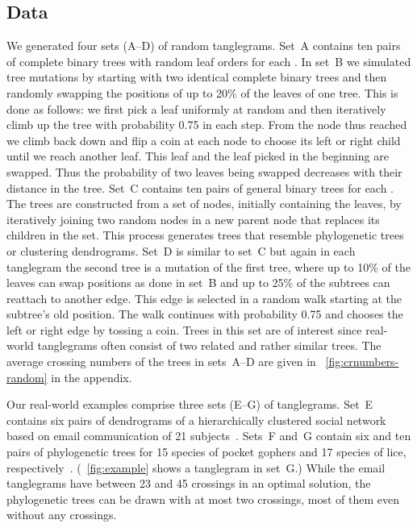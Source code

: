 \documentclass[runningheads,a4paper]{llncs}
\begin{document}
\subsection{Data}

We generated four sets (A--D) of random tanglegrams. Set~A contains
ten pairs of complete binary trees with random leaf orders for each
.  In set~B we simulated tree mutations by
starting with two identical complete binary trees and then randomly
swapping the positions of up to 20\% of the leaves of one tree. This
is done as follows: we first pick a leaf uniformly at random and
then iteratively climb up the tree with probability 0.75 in each
step. From the node thus reached we climb back down and flip a coin
at each node to choose its left or right child until we reach
another leaf. This leaf and the leaf picked in the beginning are
swapped.  Thus the probability of two leaves being swapped decreases
with their distance in the tree. Set~C contains ten pairs of general
binary trees for each . The trees are
constructed from a set of nodes, initially containing the 
leaves, by iteratively joining two random nodes in a new parent node
that replaces its children in the set. This process generates trees
that resemble phylogenetic trees or clustering dendrograms. Set~D is
similar to set~C but again in each tanglegram the second tree is a
mutation of the first tree, where up to 10\% of the leaves can swap
positions as done in set~B and up to 25\% of the subtrees can
reattach to another edge.  This edge is selected in a random walk
starting at the subtree's old position. The walk continues with
probability 0.75 and chooses the left or right edge by tossing a
coin.  Trees in this set are of interest since real-world
tanglegrams often consist of two related and rather similar trees. The
average crossing numbers of the trees in sets~A--D are given in
\figurename~\ref{fig:crnumbers-random} in the appendix. 

Our real-world examples comprise three sets (E--G) of
tanglegrams. Set~E contains six pairs of dendrograms of a
hierarchically clustered social network based on email communication
of 21 subjects~\cite{ggw-lvavl-08}. Sets~F and~G contain six and ten
pairs of phylogenetic trees for 15 species of pocket gophers and 17
species of lice, respectively~\cite{hsvsdn-drmec-94}. 
(\figurename~\ref{fig:example} shows a tanglegram in set~G.)
While the email tanglegrams have between 23 and 45 crossings
in an optimal solution, the phylogenetic trees can be drawn with at
most two crossings, most of them even without any crossings.
\end{document}
